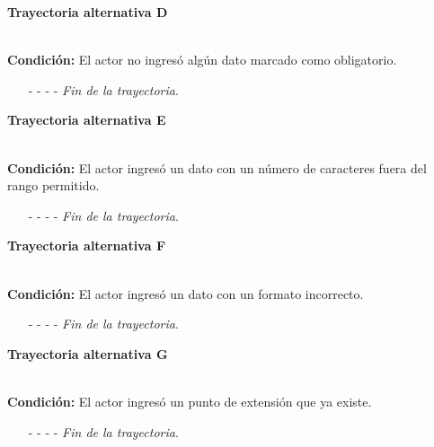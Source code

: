 \hypertarget{CU12-1-6-1:TAD}{\textbf{Trayectoria alternativa D}}\\
\noindent \textbf{Condición:} El actor no ingresó algún dato marcado como obligatorio.
\begin{enumerate}
	\UCpaso[\UCsist] Muestra el mensaje  señalando el campo que presenta el error en la pantalla .
	\UCpaso Regresa al paso \ref{CU12.1.6.1-P4} de la trayectoria principal.
	\item[- -] - - {\em {Fin de la trayectoria}}.%
\end{enumerate}
\hypertarget{CU12-1-6-1:TAE}{\textbf{Trayectoria alternativa E}}\\
\noindent \textbf{Condición:} El actor ingresó un dato con un número de caracteres fuera del rango permitido.
\begin{enumerate}
	\UCpaso[\UCsist] Muestra el mensaje  señalando el campo que presenta el error en la pantalla .
	\UCpaso Regresa al paso \ref{CU12.1.6.1-P4} de la trayectoria principal.
	\item[- -] - - {\em {Fin de la trayectoria}}.%
\end{enumerate}
\hypertarget{CU12-1-6-1:TAF}{\textbf{Trayectoria alternativa F}}\\
\noindent \textbf{Condición:} El actor ingresó un dato con un formato incorrecto.
\begin{enumerate}
	\UCpaso[\UCsist] Muestra el mensaje  señalando el campo que presenta el error en la pantalla .
	\UCpaso Regresa al paso \ref{CU12.1.6.1-P4} de la trayectoria principal.
	\item[- -] - - {\em {Fin de la trayectoria}}.
\end{enumerate}
\hypertarget{CU12-1-6-1:TAG}{\textbf{Trayectoria alternativa G}}\\
\noindent \textbf{Condición:} El actor ingresó un punto de extensión que ya existe.
\begin{enumerate}
	\UCpaso[\UCsist] Muestra el mensaje  señalando el campo que presenta la duplicidad en la pantalla .
	\UCpaso Regresa al paso \ref{CU12.1.6.1-P4} de la trayectoria principal.
	\item[- -] - - {\em {Fin de la trayectoria}}.
\end{enumerate}
